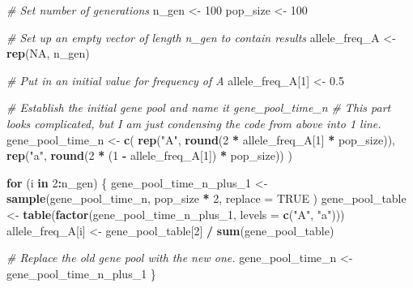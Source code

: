 \documentclass[
  a4paper]{book}
\newenvironment{Shaded}{\begin{snugshade}}{\end{snugshade}}
\newcommand{\AttributeTok}[1]{\textcolor[rgb]{0.13,0.29,0.53}{#1}}
\newcommand{\CommentTok}[1]{\textcolor[rgb]{0.56,0.35,0.01}{\textit{#1}}}
\newcommand{\ConstantTok}[1]{\textcolor[rgb]{0.56,0.35,0.01}{#1}}
\newcommand{\ControlFlowTok}[1]{\textcolor[rgb]{0.13,0.29,0.53}{\textbf{#1}}}
\newcommand{\DecValTok}[1]{\textcolor[rgb]{0.00,0.00,0.81}{#1}}
\newcommand{\FloatTok}[1]{\textcolor[rgb]{0.00,0.00,0.81}{#1}}
\newcommand{\FunctionTok}[1]{\textcolor[rgb]{0.13,0.29,0.53}{\textbf{#1}}}
\newcommand{\NormalTok}[1]{#1}
\newcommand{\OtherTok}[1]{\textcolor[rgb]{0.56,0.35,0.01}{#1}}
\newcommand{\SpecialCharTok}[1]{\textcolor[rgb]{0.81,0.36,0.00}{\textbf{#1}}}
\newcommand{\StringTok}[1]{\textcolor[rgb]{0.31,0.60,0.02}{#1}}
\begin{document}
\begin{Shaded}
\begin{Highlighting}[]
\CommentTok{\# Set number of generations}
\NormalTok{n\_gen }\OtherTok{\textless{}{-}} \DecValTok{100}
\NormalTok{pop\_size }\OtherTok{\textless{}{-}} \DecValTok{100}

\CommentTok{\# Set up an empty vector of length n\_gen to contain results}
\NormalTok{allele\_freq\_A }\OtherTok{\textless{}{-}} \FunctionTok{rep}\NormalTok{(}\ConstantTok{NA}\NormalTok{, n\_gen)}

\CommentTok{\# Put in an initial value for frequency of A}
\NormalTok{allele\_freq\_A[}\DecValTok{1}\NormalTok{] }\OtherTok{\textless{}{-}} \FloatTok{0.5}

\CommentTok{\# Establish the initial gene pool and name it gene\_pool\_time\_n}
\CommentTok{\# This part looks complicated, but I am just condensing the code from above into 1 line.}
\NormalTok{gene\_pool\_time\_n }\OtherTok{\textless{}{-}} \FunctionTok{c}\NormalTok{(}
  \FunctionTok{rep}\NormalTok{(}\StringTok{"A"}\NormalTok{, }\FunctionTok{round}\NormalTok{(}\DecValTok{2} \SpecialCharTok{*}\NormalTok{ allele\_freq\_A[}\DecValTok{1}\NormalTok{] }\SpecialCharTok{*}\NormalTok{ pop\_size)),}
  \FunctionTok{rep}\NormalTok{(}\StringTok{"a"}\NormalTok{, }\FunctionTok{round}\NormalTok{(}\DecValTok{2} \SpecialCharTok{*}\NormalTok{ (}\DecValTok{1} \SpecialCharTok{{-}}\NormalTok{ allele\_freq\_A[}\DecValTok{1}\NormalTok{]) }\SpecialCharTok{*}\NormalTok{ pop\_size))}
\NormalTok{)}

\ControlFlowTok{for}\NormalTok{ (i }\ControlFlowTok{in} \DecValTok{2}\SpecialCharTok{:}\NormalTok{n\_gen) \{}
\NormalTok{  gene\_pool\_time\_n\_plus\_1 }\OtherTok{\textless{}{-}} \FunctionTok{sample}\NormalTok{(gene\_pool\_time\_n,}
\NormalTok{    pop\_size }\SpecialCharTok{*} \DecValTok{2}\NormalTok{,}
    \AttributeTok{replace =} \ConstantTok{TRUE}
\NormalTok{  )}
\NormalTok{  gene\_pool\_table }\OtherTok{\textless{}{-}} \FunctionTok{table}\NormalTok{(}\FunctionTok{factor}\NormalTok{(gene\_pool\_time\_n\_plus\_1, }\AttributeTok{levels =} \FunctionTok{c}\NormalTok{(}\StringTok{"A"}\NormalTok{, }\StringTok{"a"}\NormalTok{)))}
\NormalTok{  allele\_freq\_A[i] }\OtherTok{\textless{}{-}}\NormalTok{ gene\_pool\_table[}\DecValTok{2}\NormalTok{] }\SpecialCharTok{/} \FunctionTok{sum}\NormalTok{(gene\_pool\_table)}

  \CommentTok{\# Replace the old gene pool with the new one.}
\NormalTok{  gene\_pool\_time\_n }\OtherTok{\textless{}{-}}\NormalTok{ gene\_pool\_time\_n\_plus\_1}
\NormalTok{\}}
\end{Highlighting}
\end{Shaded}
\end{document}
